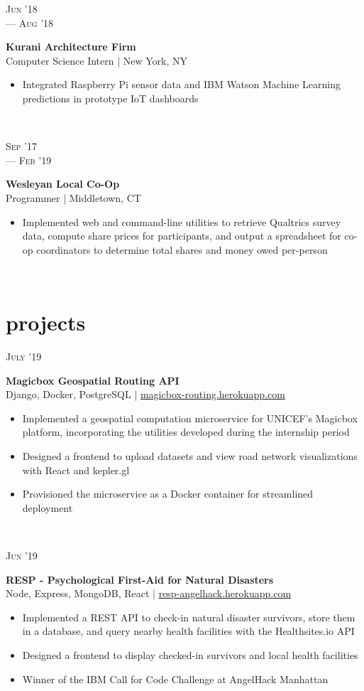 \documentclass[letterpaper, 10.5pt]{article}
\newcommand{\expentry}[5]{
    \begin{minipage}[t]{.15\linewidth}
    \hfill \textsc{#1} \\
    \hfill \hspace*{5pt}\hfill --- \textsc{#2}
    \end{minipage}
    \hfill\vline\hfill
    \begin{minipage}[t]{.80\linewidth}
    {\bf\large#3}
    \\ #4 
    \vspace{-1.5mm}
    \small{#5}
    \end{minipage}\\
    \vspace{.125cm}
    }
\newcommand{\projectentry}[4]{
    \begin{minipage}[t]{.15\linewidth}
    \hfill \textsc{#1}
    \end{minipage}
    \hfill\vline\hfill
    \begin{minipage}[t]{.80\linewidth}
    {\bf#2}
    \\ #3 
    \vspace{-1.0mm}
    \small{#4}
    \end{minipage}\\
    \vspace{.125cm}
    }
\begin{document}
    \expentry{Jun '18}
    {Aug '18}
    {Kurani Architecture Firm}
    {Computer Science Intern | New York, NY}
    {\begin{itemize}
          \setlength\itemsep{0.1mm}
          \item Integrated Raspberry Pi sensor data and IBM Watson Machine Learning predictions in prototype IoT dashboards
        \end{itemize}
    }

    \expentry{Sep '17}
    {Feb '19}
    {Wesleyan Local Co-Op}
    {Programmer | Middletown, CT}
    {\begin{itemize}
          \setlength\itemsep{0.1mm}
          \item Implemented web and command-line utilities to retrieve Qualtrics survey data, compute share prices for participants, and output a spreadsheet for co-op coordinators to determine total shares and money owed per-person
        \end{itemize}
    }

    \section{projects}

        \projectentry{July '19}
            {Magicbox Geospatial Routing API}
            {Django, Docker, PostgreSQL | \href{https://magicbox-routing.herokuapp.com}{magicbox-routing.herokuapp.com}}
            {\begin{itemize}
                \setlength\itemsep{0.1mm}
                \item Implemented a geospatial computation microservice for UNICEF's Magicbox platform, incorporating the utilities developed during the internship period
                \item Designed a frontend to upload datasets and view road network visualizations with React and kepler.gl
                \item Provisioned the microservice as a Docker container for streamlined deployment
            \end{itemize}
            }

        \projectentry{Jun '19}
            {RESP - Psychological First-Aid for Natural Disasters}
            {Node, Express, MongoDB, React | \href{https://resp-angelhack.herokuapp.com}{resp-angelhack.herokuapp.com}}
            {\begin{itemize}
                \setlength\itemsep{0.1mm}
                \item Implemented a REST API to check-in natural disaster survivors, store them in a database, and query nearby health facilities with the Healthsites.io API
                \item Designed a frontend  to display checked-in survivors and local health facilities
                \item Winner of the IBM Call for Code Challenge at AngelHack Manhattan
            \end{itemize}
            }
            
\end{document}
